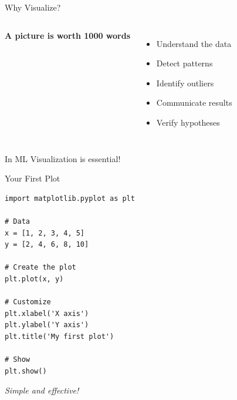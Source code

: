 \documentclass[aspectratio=169]{beamer}
\begin{document}
\begin{frame}{Why Visualize?}
\begin{columns}[T]
\textbf{A picture is worth 1000 words}
\begin{itemize}
    \item Understand the data
    \item Detect patterns
    \item Identify outliers
    \item Communicate results
    \item Verify hypotheses
\end{itemize}

\begin{center}
\end{center}
\end{columns}

\vspace{0.5cm}
\begin{alertblock}{In ML}
Visualization is essential!
\end{alertblock}
\end{frame}

\begin{frame}[fragile]{Your First Plot}
\begin{lstlisting}
import matplotlib.pyplot as plt

# Data
x = [1, 2, 3, 4, 5]
y = [2, 4, 6, 8, 10]

# Create the plot
plt.plot(x, y)

# Customize
plt.xlabel('X axis')
plt.ylabel('Y axis')
plt.title('My first plot')

# Show
plt.show()
\end{lstlisting}

\vspace{0.2cm}
\textit{Simple and effective!}
\end{frame}
\end{document}
